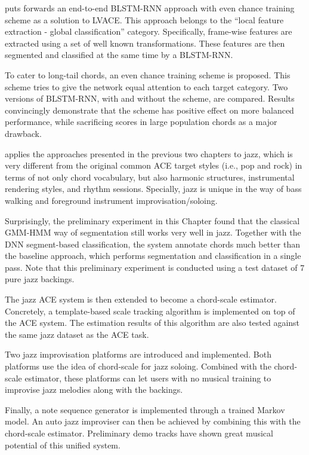  puts forwards an end-to-end BLSTM-RNN approach with even chance training scheme as a solution to LVACE. This approach belongs to the ``local feature extraction - global classification'' category. Specifically, frame-wise features are extracted using a set of well known transformations. These features are then segmented and classified at the same time by a BLSTM-RNN.

To cater to long-tail chords, an even chance training scheme is proposed. This scheme tries to give the network equal attention to each target category. Two versions of BLSTM-RNN, with and without the scheme, are compared. Results convincingly demonstrate that the scheme has positive effect on more balanced performance, while sacrificing scores in large population chords as a major drawback.

 applies the approaches presented in the previous two chapters to jazz, which is very different from the original common ACE target styles (i.e., pop and rock) in terms of not only chord vocabulary, but also harmonic structures, instrumental rendering styles, and rhythm sessions. Specially, jazz is unique in the way of bass walking and foreground instrument improvisation/soloing.

Surprisingly, the preliminary experiment in this Chapter found that the classical GMM-HMM way of segmentation still works very well in jazz. Together with the DNN segment-based classification, the system annotate chords much better than the baseline approach, which performs segmentation and classification in a single pass. Note that this preliminary experiment is conducted using a test dataset of 7 pure jazz backings.

The jazz ACE system is then extended to become a chord-scale estimator. Concretely, a template-based scale tracking algorithm is implemented on top of the ACE system. The estimation results of this algorithm are also tested against the same jazz dataset as the ACE task. %

Two jazz improvisation platforms are introduced and implemented. Both platforms use the idea of chord-scale for jazz soloing. Combined with the chord-scale estimator, these platforms can let users with no musical training to improvise jazz melodies along with the backings.

Finally, a note sequence generator is implemented through a trained Markov model. An auto jazz improviser can then be achieved by combining this with the chord-scale estimator. Preliminary demo tracks have shown great musical potential of this unified system.

